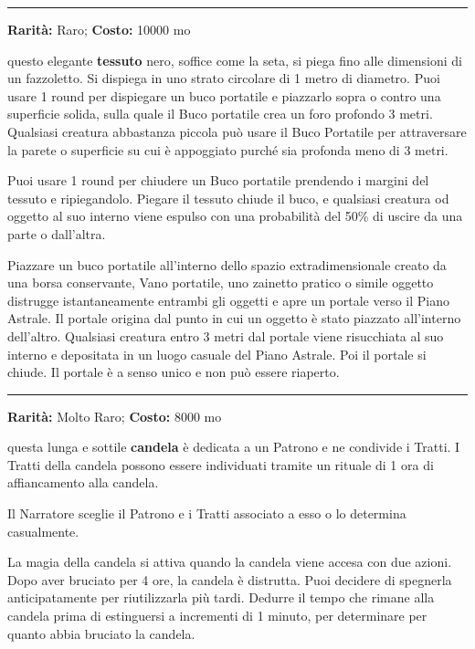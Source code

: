 \begin{multicols}{2}
\smallskip\noindent\rule{\linewidth}{2pt}  \hypertarget{BucoPortatile}{}\medskip{}\noindent\label{BucoPortatile}

\textbf{Rarità:} Raro; \textbf{Costo:} 10000 mo

questo elegante \textbf{tessuto} nero, soffice come la seta, si piega fino alle dimensioni di un fazzoletto. Si dispiega in uno strato circolare di 1 metro di diametro. Puoi usare 1 round per dispiegare un buco portatile e piazzarlo sopra o contro una superficie solida, sulla quale il Buco portatile crea un foro profondo 3 metri. Qualsiasi creatura abbastanza piccola può usare il Buco Portatile per attraversare la parete o superficie su cui è appoggiato purché sia profonda meno di 3 metri.

Puoi usare 1 round per chiudere un Buco portatile prendendo i margini del tessuto e ripiegandolo. Piegare il tessuto chiude il buco, e qualsiasi creatura od oggetto al suo interno viene espulso con una probabilità del 50\% di uscire da una parte o dall'altra.

Piazzare un buco portatile all'interno dello spazio extradimensionale creato da una borsa conservante, Vano portatile, uno zainetto pratico o simile oggetto distrugge istantaneamente entrambi gli oggetti e apre un portale verso il Piano Astrale. Il portale origina dal punto in cui un oggetto è stato piazzato all'interno dell'altro. Qualsiasi creatura entro 3 metri dal portale viene risucchiata al suo interno e depositata in un luogo casuale del Piano Astrale. Poi il portale si chiude. Il portale è a senso unico e non può essere riaperto.

\smallskip\noindent\rule{\linewidth}{2pt}  \hypertarget{CandeladiInvocazione}{}\medskip{}\noindent\label{CandeladiInvocazione}

\textbf{Rarità:} Molto Raro; \textbf{Costo:} 8000 mo

questa lunga e sottile \textbf{candela} è dedicata a un Patrono e ne condivide i Tratti. I Tratti della candela possono essere individuati tramite un rituale di 1 ora di affiancamento alla candela.

Il Narratore sceglie il Patrono e i Tratti associato a esso o lo determina casualmente.

La magia della candela si attiva quando la candela viene accesa con due azioni. Dopo aver bruciato per 4 ore, la candela è distrutta. Puoi decidere di spegnerla anticipatamente per riutilizzarla più tardi. Dedurre il tempo che rimane alla candela prima di estinguersi a incrementi di 1 minuto, per determinare per quanto abbia bruciato la candela.


\end{multicols}
